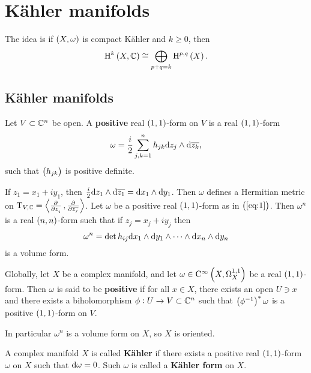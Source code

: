 \pagebreak

\section{K\"ahler manifolds}

The idea is if $ \br{X, \omega} $ is compact K\"ahler and $ k \ge 0 $, then
$$ \H^k\br{X, \CC} \cong \bigoplus_{p + q = k} \H^{p, q}\br{X}. $$

\subsection{K\"ahler manifolds}

\begin{definition}
Let $ V \subset \mathbb{C}^n $ be open. A \textbf{positive} real $ \br{1, 1} $-form on $ V $ is a real $ \br{1, 1} $-form
\begin{equation}
\label{eq:1}
\omega = \dfrac{i}{2}\sum_{j, k = 1}^n h_{jk}\mathrm{d} z_j \wedge \mathrm{d}\overline{z_k},
\end{equation}
such that $ \br{h_{jk}} $ is positive definite.
\end{definition}

If $ z_1 = x_1 + iy_1 $, then $ \tfrac{i}{2}\mathrm{d} z_1 \wedge \mathrm{d}\overline{z_1} = \mathrm{d} x_1 \wedge \mathrm{d} y_1 $. Then $ \omega $ defines a Hermitian metric on $ \T_{V, \CC} = \abr{\tpd{}{z_i}, \tpd{}{\overline{z_j}}} $. Let $ \omega $ be a positive real $ \br{1, 1} $-form as in $ \br{\ref{eq:1}} $. Then $ \omega^n $ is a real $ \br{n, n} $-form such that if $ z_j = x_j + iy_j $ then
$$ \omega^n = \det h_{ij}\mathrm{d} x_1 \wedge \mathrm{d} y_1 \wedge \dots \wedge \mathrm{d} x_n \wedge \mathrm{d} y_n $$
is a volume form.

\begin{definition}
Globally, let $ X $ be a complex manifold, and let $ \omega \in \CO{X}{1, 1} $ be a real $ \br{1, 1} $-form. Then $ \omega $ is said to be \textbf{positive} if for all $ x \in X $, there exists an open $ U \ni x $ and there exists a biholomorphism $ \phi : U \to V \subset \mathbb{C}^n $ such that $ \br{\phi^{-1}}^*\omega $ is a positive $ \br{1, 1} $-form on $ V $.
\end{definition}

In particular $ \omega^n $ is a volume form on $ X $, so $ X $ is oriented.

\begin{definition}
A complex manifold $ X $ is called \textbf{K\"ahler} if there exists a positive real $ \br{1, 1} $-form $ \omega $ on $ X $ such that $ \mathrm{d}\omega = 0 $. Such $ \omega $ is called a \textbf{K\"ahler form} on $ X $.
\end{definition}

